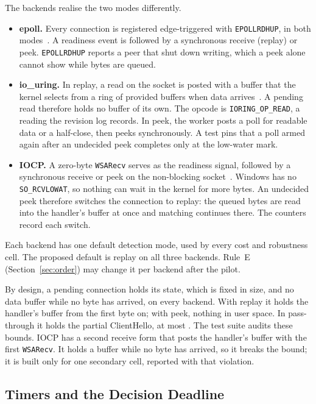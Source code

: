 The backends realise the two modes differently.
\begin{itemize}
\item \textbf{epoll.} Every connection is registered edge-triggered with \texttt{EPOLLRDHUP}, in
both modes~\cite{man2026epoll}. A readiness event is followed by a synchronous receive (replay) or
peek. \texttt{EPOLLRDHUP} reports a peer that shut down writing, which a peek alone cannot show
while bytes are queued.
\item \textbf{io\_uring.} In replay, a read on the socket is posted with a buffer that the kernel
selects from a ring of provided buffers when data arrives~\cite{man2026iouring}. A pending read
therefore holds no buffer of its own. The opcode is \texttt{IORING\_OP\_READ}, a reading the
revision log records. In peek, the worker posts a poll for readable data or a half-close, then
peeks synchronously. A test pins that a poll armed again after an undecided peek completes only
at the low-water mark.
\item \textbf{IOCP.} A zero-byte \texttt{WSARecv} serves as the readiness signal, followed by a
synchronous receive or peek on the non-blocking socket~\cite{microsoft2026wsarecv}. Windows has
no \texttt{SO\_RCVLOWAT}, so nothing can wait in the kernel for more bytes. An undecided peek
therefore switches the connection to replay: the queued bytes are read into the handler's buffer
at once and matching continues there. The counters record each switch.
\end{itemize}
Each backend has one default detection mode, used by every cost and robustness cell. The proposed
default is replay on all three backends. Rule~E (Section~\ref{sec:order}) may change it per
backend after the pilot.

 By design, a pending connection holds its state, which is
fixed in size, and no data buffer while no byte has arrived, on every backend. With replay it
holds the handler's buffer from the first byte on; with peek, nothing in user space. In
pass-through it holds the partial ClientHello, at most \Bch{}. The test suite audits these bounds. IOCP has a second
receive form that posts the handler's buffer with the first \texttt{WSARecv}. It holds a buffer
while no byte has arrived, so it breaks the bound; it is built only for one secondary cell,
reported with that violation.

\subsection{Timers and the Decision Deadline}\label{sec:timers}


